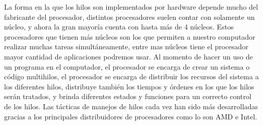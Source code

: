 \documentclass[12pt]{article}
\begin{document}
La forma en la que los hilos son implementados por hardware depende mucho del fabricante del procesador, distintos procesadores suelen contar con solamente un núcleo, y ahora la gran mayoría cuenta con hasta más de 4 núcleos. Estos procesadores que tienen más núcleos son los que permiten a nuestro computador realizar muchas tareas simultáneamente, entre mas núcleos tiene el procesador  mayor cantidad de aplicaciones podremos usar. Al momento de hacer un uso de un programa en el computador, el procesador se encarga de crear un sistema o código multihilos, el procesador se encarga de distribuir los recursos del sistema a los diferentes hilos, distribuye también los tiempos y órdenes en los que los hilos serán tratados, y brinda diferentes estados y funciones para un correcto control de los hilos. Las tácticas de manejos de hilos cada vez han sido más desarrolladas gracias a los principales distribuidores de procesadores como lo son AMD e Intel.




\medskip
 
\end{document}
